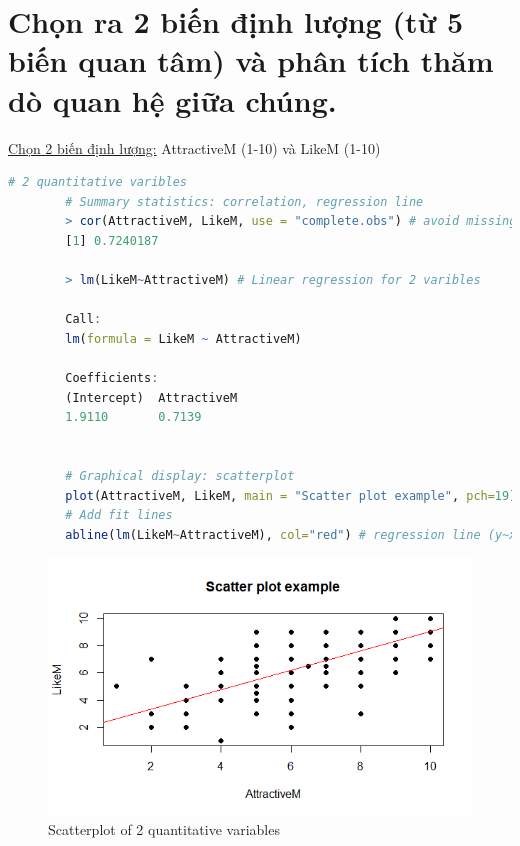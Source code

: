 \documentclass[a4paper,12pt]{article}
\begin{document}
	\section{Chọn ra 2 biến định lượng (từ 5 biến quan tâm) và phân tích thăm dò quan hệ giữa chúng.}
	\label{Cau6}
	\underline{Chọn 2 biến định lượng:} AttractiveM (1-10) và LikeM (1-10)\\
	
	
	\begin{lstlisting}[language=R]
		# 2 quantitative varibles
		# Summary statistics: correlation, regression line
		> cor(AttractiveM, LikeM, use = "complete.obs") # avoid missing value NA
		[1] 0.7240187
		
		> lm(LikeM~AttractiveM) # Linear regression for 2 varibles
		
		Call:
		lm(formula = LikeM ~ AttractiveM)
		
		Coefficients:
		(Intercept)  AttractiveM  
		1.9110       0.7139
		
		
		# Graphical display: scatterplot
		plot(AttractiveM, LikeM, main = "Scatter plot example", pch=19)
		# Add fit lines
		abline(lm(LikeM~AttractiveM), col="red") # regression line (y~x)
	\end{lstlisting}
	
	\begin{figure}[H]
		\centering
		\includegraphics[width=0.8\linewidth]{Images/scatterplot}
		\caption{Scatterplot of 2 quantitative variables}
		\label{fig:scatterplot}
	\end{figure}
	
\end{document}

